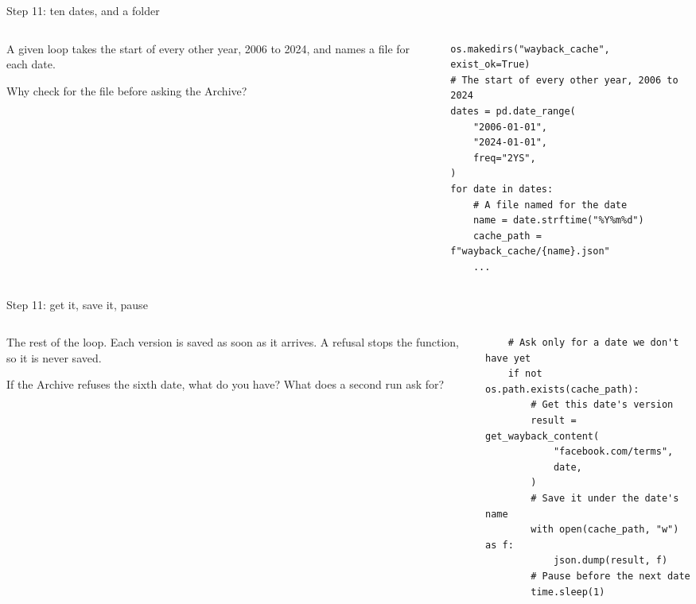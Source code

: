 \documentclass[9pt,aspectratio=169]{beamer}
\begin{document}
\begin{frame}[fragile]{Step 11: ten dates, and a folder}
    \begin{columns}[T]
        \begin{column}{0.37\textwidth}
            A given loop takes the start of every other year, 2006 to 2024, and names a file for each date.

            \medskip
            Why check for the file before asking the Archive?
        \end{column}
        \begin{column}{0.6\textwidth}
\begin{lstlisting}
os.makedirs("wayback_cache", exist_ok=True)
# The start of every other year, 2006 to 2024
dates = pd.date_range(
    "2006-01-01",
    "2024-01-01",
    freq="2YS",
)
for date in dates:
    # A file named for the date
    name = date.strftime("%Y%m%d")
    cache_path = f"wayback_cache/{name}.json"
    ...
\end{lstlisting}
        \end{column}
    \end{columns}
\end{frame}

\begin{frame}[fragile]{Step 11: get it, save it, pause}
    \begin{columns}[T]
        \begin{column}{0.37\textwidth}
            The rest of the loop. Each version is saved as soon as it arrives. A refusal stops the function, so it is never saved.

            \medskip
            If the Archive refuses the sixth date, what do you have? What does a second run ask for?
        \end{column}
        \begin{column}{0.6\textwidth}
\begin{lstlisting}
    # Ask only for a date we don't have yet
    if not os.path.exists(cache_path):
        # Get this date's version
        result = get_wayback_content(
            "facebook.com/terms",
            date,
        )
        # Save it under the date's name
        with open(cache_path, "w") as f:
            json.dump(result, f)
        # Pause before the next date
        time.sleep(1)
\end{lstlisting}
        \end{column}
    \end{columns}
\end{frame}
\end{document}
